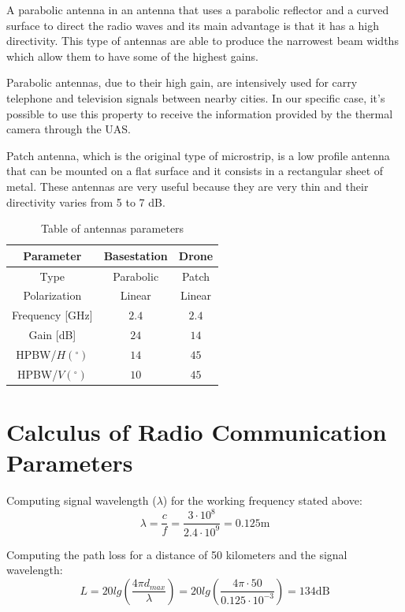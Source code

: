 A parabolic antenna in an antenna that uses a parabolic reflector and a curved surface to direct the radio waves and its main advantage is that it has a high directivity. This type of antennas are able to produce the narrowest beam widths which allow them to have some of the highest gains.

Parabolic antennas, due to their high gain, are intensively used for carry telephone and television signals between nearby cities. In our specific case, it’s possible to use this property to receive the information provided by the thermal camera through the UAS.

Patch antenna, which is the original type of microstrip, is a low profile antenna that can be mounted on a flat surface and it consists in a rectangular sheet of metal. These antennas are very useful because they are very thin and their directivity varies from 5 to 7 dB.

\begin{table}[h!]
\centering
	\begin{tabular}{|c||c|c|}
		\hline
		Parameter & Basestation & Drone\\ \hline\hline
		Type & Parabolic & Patch\\ \hline
		Polarization & Linear & Linear\\ \hline
		Frequency [GHz] & $2.4$ & $2.4$\\ \hline
		Gain [dB] & $24$ & $14$\\ \hline
		HPBW/$H(^{\circ})$ & $14$ & $45$\\ \hline
		HPBW/$V(^{\circ})$ & $10$ & $45$\\ \hline
	\end{tabular}
	\caption{Table of antennas parameters}
	\label{table:1}
\end{table}

\section*{Calculus of Radio Communication Parameters}

Computing signal wavelength ($\lambda$) for the working frequency stated above:
\begin{equation*}\label{eq:tech_parameters3}
	\lambda = \frac{c}{f} = \frac{3\cdot 10^{8}}{2.4\cdot 10^{9}} 
	        = 0.125 \text{m}
\end{equation*}

Computing the path loss for a distance of 50 kilometers and the signal wavelength:
\begin{equation*}\label{eq:tech_parameters4}
	L = 20lg\left (\frac{4\pi d_{max}}{\lambda} \right)
	  = 20lg\left (\frac{4\pi \cdot 50}{0.125\cdot 10^{-3}} \right)
	  = 134 \text{dB} 
\end{equation*}


